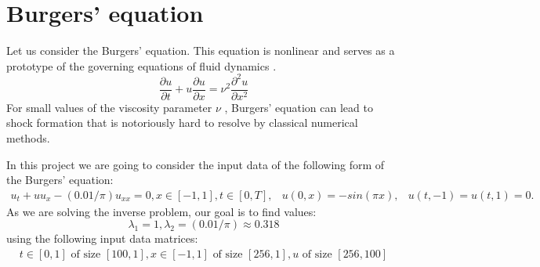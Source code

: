 \documentclass{beamer}
\def\\{}%
\begin{document}



\section{Burgers' equation}

\begin{frame}

Let us consider the Burgers' equation. This equation is nonlinear and serves as a prototype of the governing equations of fluid dynamics \cite{comp1986fluids}. 
\begin{equation*}
    \frac{\partial u}{\partial t} + u \frac{\partial u}{\partial x} = \nu^2 \frac{\partial^2 u}{\partial x^2}
\end{equation*}
For small values of the viscosity parameter $\nu$ , Burgers' equation can lead to shock formation that is notoriously hard to resolve by classical numerical methods. 

\end{frame}

\begin{frame}
In this project we are going to consider the input data of the following form of
the Burgers' equation:
\begin{align*}
u_t + u u_x - (0.01/\pi)u_{xx} = 0, x \in [-1, 1], t \in [0, T], &\\
u(0, x) = -sin(\pi x), & \\
u(t, -1) = u(t, 1) = 0.&
\end{align*}
As we are solving the inverse problem, our goal is to find values:
\[
    \lambda_1 = 1,  \lambda_2 = (0.01 / \pi) \approx 0.318
\]
using the
following input data matrices: 
\begin{align*}
t \in [0, 1] \text{ of size } [100, 1], \\ x
\in [-1, 1] \text{ of size } [256, 1], u \text{ of size } [256, 100]
\end{align*}

\end{frame}
\end{document}
